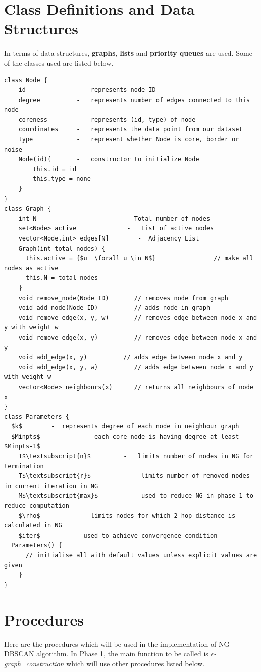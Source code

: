 \documentclass[acmsmall]{acmart}
\begin{document}
\section* {Class Definitions and Data Structures}
In terms of data structures, \textbf{graphs}, \textbf{lists} and \textbf{priority queues} are used. Some of the classes used are listed below.
\begin{lstlisting}
class Node {
    id              -   represents node ID
    degree          -   represents number of edges connected to this node
    coreness        -   represents (id, type) of node
    coordinates     -   represents the data point from our dataset
    type            -   represent whether Node is core, border or noise
    Node(id){       -   constructor to initialize Node
        this.id = id
        this.type = none
    }
}
class Graph { 
    int N                         - Total number of nodes
    set<Node> active              -   List of active nodes
    vector<Node,int> edges[N]        -  Adjacency List
    Graph(int total_nodes) {
      this.active = {$u  \forall u \in N$}                // make all nodes as active
      this.N = total_nodes
    }
    void remove_node(Node ID)       // removes node from graph
    void add_node(Node ID)          // adds node in graph
    void remove_edge(x, y, w)       // removes edge between node x and y with weight w
    void remove_edge(x, y)          // removes edge between node x and y
    void add_edge(x, y)          // adds edge between node x and y
    void add_edge(x, y, w)          // adds edge between node x and y with weight w
    vector<Node> neighbours(x)      // returns all neighbours of node x
}
class Parameters {
  $k$        -  represents degree of each node in neighbour graph
  $Minpts$           -   each core node is having degree at least $Minpts-1$
    T$\textsubscript{n}$         -   limits number of nodes in NG for termination
    T$\textsubscript{r}$          -   limits number of removed nodes in current iteration in NG
    M$\textsubscript{max}$         -  used to reduce NG in phase-1 to reduce computation
    $\rho$          -   limits nodes for which 2 hop distance is calculated in NG
    $iter$          - used to achieve convergence condition
  Parameters() {
      // initialise all with default values unless explicit values are given
    }
}
\end{lstlisting}

\section* {Procedures}
Here are the procedures which will be used in the implementation of NG-DBSCAN algorithm. \newline
In Phase 1, the main function to be called is \textit{$\epsilon$-graph\_construction} which will use other procedures listed below.
\end{document}

